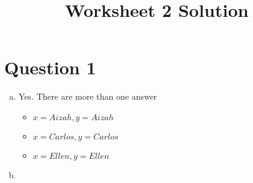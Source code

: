 \documentclass[12pt]{article}
\begin{document}
\title{Worksheet 2 Solution}
\maketitle

\section*{Question 1}

\begin{enumerate}[a)]
    \item
        Yes. There are more than one answer

        \begin{itemize}
            \item $x = Aizah, y = Aizah$
            \item $x = Carlos, y = Carlos$
            \item $x = Ellen, y = Ellen$
        \end{itemize}

    \bigskip

    \item

\end{enumerate}
\end{document}
